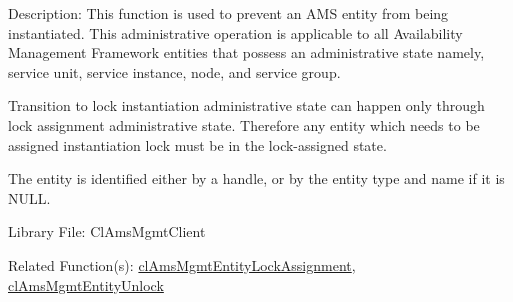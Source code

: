 \begin{Desc}
\item[Description:]This function is used to prevent an AMS entity from being instantiated. This administrative operation is applicable to all Availability Management Framework entities that possess an administrative state namely, service unit, service instance, node, and service group. \par
 \par
 Transition to lock instantiation administrative state can happen only through lock assignment administrative state. Therefore any entity which needs to be assigned instantiation lock must be in the lock-assigned state. \par
 The entity is identified either by a handle, or by the entity type and name if it is NULL.\end{Desc}
\begin{Desc}
\item[Library File:]Cl\-Ams\-Mgmt\-Client\end{Desc}
\begin{Desc}
\item[Related Function(s):]\hyperlink{pageams110}{cl\-Ams\-Mgmt\-Entity\-Lock\-Assignment}, \hyperlink{pageams112}{cl\-Ams\-Mgmt\-Entity\-Unlock} \end{Desc}

\newpage
